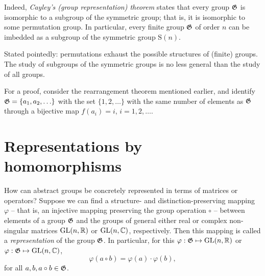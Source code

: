 Indeed,  {\em Cayley's (group representation) theorem}
states that every group ${\frak G}$ is isomorphic to a subgroup
of the symmetric group; that is, it is  isomorphic to some permutation group.
In particular, every finite group ${\frak G}$ of order $n$  can be imbedded as
a subgroup
of the symmetric group $\textrm{S}(n)$.

Stated pointedly: permutations exhaust the possible structures of (finite) groups.
The study of subgroups of the symmetric groups is no less general than the study of all groups.

{\color{OliveGreen}
\bproof
For a proof, consider the rearrangement theorem mentioned earlier, and identify ${\frak G}=\{a_1,a_2,\ldots\}$ with the set $\{1,2,\ldots\}$ with the same number of elements as ${\frak G}$ through a bijective map $f(a_i)=i$,
$i= 1,2, \ldots$.
\eproof
}





\section{Representations by homomorphisms}

How can abstract groups be concretely represented in terms of matrices or operators?
Suppose we can find a structure- and distinction-preserving mapping $\varphi$ -- that is, an injective mapping preserving the group operation $\circ$  --
between elements of a group ${\frak G}$
and the groups of general either real or complex non-singular  matrices $\textrm{GL}(n,{\Bbb R})$ or $\textrm{GL}(n,{\Bbb C})$, respectively.
Then this mapping is called
a {\em representation}
 of the group ${\frak G}$.
In particular,
for this $\varphi  : {\frak G} \mapsto  \textrm{GL}(n,{\Bbb R})$ or $\varphi : {\frak G} \mapsto \textrm{GL}(n,{\Bbb C})$,
\begin{equation}
\varphi (a\circ b)   = \varphi (a)\cdot \varphi (b),
\end{equation}
for all
$a,b, a\circ b \in {\frak G}$.

